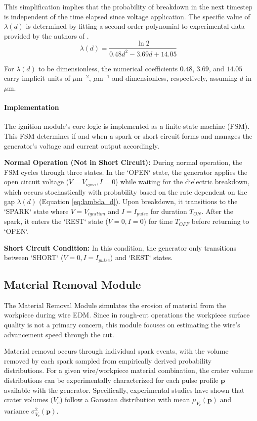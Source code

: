 \documentclass[5p,times,procedia]{elsarticle}
\begin{document}
This simplification implies that the probability of breakdown in the next timestep is independent of the time elapsed since voltage application. The specific value of $\lambda(d)$ is determined by fitting a second-order polynomial to experimental data provided by the authors of \cite{jmmp7050177}.
\begin{equation}
    \lambda(d) = \frac{\ln 2}{0.48d^2 - 3.69d + 14.05}
    \label{eq:lambda_d}
\end{equation}

For $\lambda(d)$ to be dimensionless, the numerical coefficients $0.48$, $3.69$, and $14.05$ carry implicit units of $\mu\text{m}^{-2}$, $\mu\text{m}^{-1}$ and dimensionless, respectively, assuming $d$ in $\mu\text{m}.$

\paragraph{Implementation}
The ignition module's core logic is implemented as a finite-state machine (FSM). This FSM determines if and when a spark or short circuit forms and manages the generator's voltage and current output accordingly.

\textbf{Normal Operation (Not in Short Circuit):}
During normal operation, the FSM cycles through three states. In the `OPEN` state, the generator applies the open circuit voltage ($V = V_{open}, I = 0$) while waiting for the dielectric breakdown, which occurs stochastically with probability based on the rate dependent on the gap $\lambda(d)$ (Equation \ref{eq:lambda_d}). Upon breakdown, it transitions to the `SPARK` state where $V = V_{ignition}$ and $I = I_{pulse}$ for duration $T_{ON}$. After the spark, it enters the `REST` state ($V = 0, I = 0$) for time $T_{OFF}$ before returning to `OPEN`.

\textbf{Short Circuit Condition:}
In this condition, the generator only transitions between `SHORT` ($V = 0, I = I_{pulse}$) and `REST` states. 

\subsection{Material Removal Module}
The Material Removal Module simulates the erosion of material from the workpiece during wire EDM. Since in rough-cut operations the workpiece surface quality is not a primary concern, this module focuses on estimating the wire's advancement speed through the cut.

Material removal occurs through individual spark events, with the volume removed by each spark sampled from empirically derived probability distributions. For a given wire/workpiece material combination, the crater volume distributions can be experimentally characterized for each pulse profile $\mathbf{p}$ available with the generator. Specifically, experimental studies \cite{gonzalezsanchez2024} have shown that crater volumes ($V_c$) follow a Gaussian distribution with mean $\mu_{V_c}(\mathbf{p})$ and variance $\sigma_{V_c}^2(\mathbf{p})$.
\end{document}
